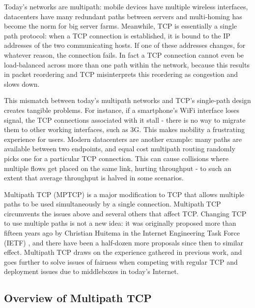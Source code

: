 

Today's networks are multipath: mobile devices have multiple wireless
interfaces, datacenters have many redundant paths between servers and
multi-homing has become the norm for big server farms. Meanwhile, TCP
is essentially a single path protocol: when a TCP connection is
established, it is bound to the IP addresses of the two communicating
hosts. If one of these addresses changes, for whatever reason, the
connection fails. In fact a TCP connection cannot even be
load-balanced across more than one path within the network, because
this results in packet reordering and TCP misinterprets this
reordering as congestion and slows down.

This mismatch between today's multipath networks and TCP's single-path
design creates tangible problems. For instance, if a smartphone's WiFi interface
loses signal, the TCP connections associated with it stall - there is
no way to migrate them to other working interfaces, such as 3G. This
makes mobility a frustrating experience for users.  Modern datacenters
are another example: many paths are available between two endpoints,
and equal cost multipath routing randomly picks one for a particular TCP
connection.  This can cause collisions where multiple flows get placed
on the same link, hurting throughput - to such an extent that average 
throughput is halved in some scenarios.

Multipath TCP (MPTCP) \cite{rfc6284} is a major modification to TCP that allows multiple
paths to be used simultaneously by a single 
connection. Multipath TCP circumvents the issues above and several
others that affect TCP.  Changing TCP to use multiple paths is not a
new idea: it was originally proposed more than fifteen years ago by
Christian Huitema in the Internet Engineering Task Force (IETF) \cite{Huitema_Multi-homed:1995}, and
there have been a half-dozen more proposals since then to similar
effect. Multipath TCP draws on the experience gathered in previous
work, and goes further to solve issues of fairness when competing with
regular TCP and deployment issues due to middleboxes in today's
Internet. 

\subsection{Overview of Multipath TCP}

